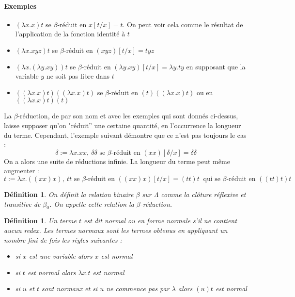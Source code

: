 \documentclass[a4paper,12pt]{article}
\theoremstyle{plain}
\newtheorem{defi}[theo]{Définition}
\begin{document}
\paragraph{Exemples}
\begin{itemize}
\setlength\itemsep{ -1.3 em}
\item $(\lambda x.x)t$ se $\beta$-réduit en $x[t/x] = t$. On peut voir cela comme le résultat de l'application de la fonction identité à $t$\\
\item $( \lambda x. xyz)t$ se $\beta$-réduit en $(xyz)[t/x] = tyz$\\
\item $( \lambda x.(\lambda y. xy))t$ se $\beta$-réduit en $ (\lambda y. xy)[t/x] = \lambda y.ty$ en supposant que la variable $y$ ne soit pas libre dans $t$ \\
\item $((\lambda x.x)t)((\lambda x.x)t)$ se $\beta$-réduit en $(t)((\lambda x.x)t)$ ou en $((\lambda x.x)t)(t)$
\end{itemize}

La $\beta$-réduction, de par son nom et avec les exemples qui sont donnés ci-dessus, laisse supposer qu'on "réduit'' une certaine quantité, en l'occurrence la longueur du terme. Cependant, l'exemple suivant démontre que ce n'est pas toujours le cas :
$$\delta := \lambda x.xx, \ \delta \delta \text{ se $\beta$-réduit en } (xx)[\delta/x] = \delta \delta$$
On a alors une suite de réductions infinie. La longueur du terme peut même augmenter :
$$t := \lambda x. ((xx)x), \ t t \text{ se $\beta$-réduit en } ((xx)x)[t/x] = (t t)t \ \text{ qui se $\beta$-réduit en }((t t) t) t$$

\begin{defi}
On définit la relation binaire $\beta$ sur $\Lambda$ comme la clôture réflexive et transitive de $\beta_0$. On appelle cette relation la $\beta$-réduction.
\end{defi}

\clearpage

\begin{defi}
Un terme $t$ est dit normal ou en forme normale s'il ne contient aucun redex. Les termes normaux sont les termes obtenus en appliquant un nombre fini de fois les règles suivantes :
\begin{itemize}
\setlength\itemsep{ -1.5 em}
\item si $x$ est une variable alors $x$ est normal\\
\item si $t$ est normal alors $\lambda x.t$ est normal\\
\item si $u$ et $t$ sont normaux et si $u$ ne commence pas par $\lambda$ alors $(u)t$ est normal
\end{itemize}
\end{defi}
\end{document}
